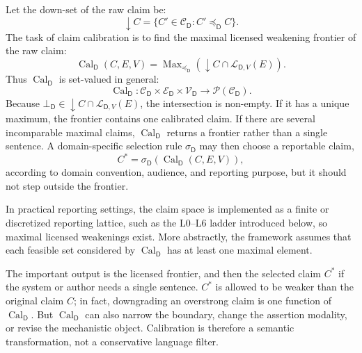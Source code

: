 \documentclass[11pt,a4paper]{article}
\newcommand{\Cal}{\operatorname{Cal}}
\newcommand{\Max}{\operatorname{Max}}
\newcommand{\Dom}{\mathsf{D}}
\begin{document}
Let the down-set of the raw claim be:
\begin{equation}
\downarrow C=\{C'\in\mathcal{C}_{\Dom}:C'\preceq_{\Dom} C\}.
\end{equation}
The task of claim calibration is to find the maximal licensed weakening frontier of the raw claim:
\begin{equation}
\Cal_{\Dom}(C,E,V)
=\Max_{\preceq_{\Dom}}\left(\downarrow C\cap\mathcal{L}_{\Dom,V}(E)\right).
\end{equation}
Thus $\Cal_{\Dom}$ is set-valued in general:
\[
\Cal_{\Dom}:\mathcal{C}_{\Dom}\times\mathcal{E}_{\Dom}\times\mathcal{V}_{\Dom}
\rightarrow \mathcal{P}(\mathcal{C}_{\Dom}).
\]
Because $\bot_{\Dom}\in\downarrow C\cap\mathcal{L}_{\Dom,V}(E)$, the intersection is non-empty. If it has a unique maximum, the frontier contains one calibrated claim. If there are several incomparable maximal claims, $\Cal_{\Dom}$ returns a frontier rather than a single sentence. A domain-specific selection rule $\sigma_{\Dom}$ may then choose a reportable claim,
\[
C^\ast=\sigma_{\Dom}(\Cal_{\Dom}(C,E,V)),
\]
according to domain convention, audience, and reporting purpose, but it should not step outside the frontier.

In practical reporting settings, the claim space is implemented as a finite or discretized reporting lattice, such as the L0--L6 ladder introduced below, so maximal licensed weakenings exist. More abstractly, the framework assumes that each feasible set considered by $\Cal_{\Dom}$ has at least one maximal element.

The important output is the licensed frontier, and then the selected claim $C^\ast$ if the system or author needs a single sentence. $C^\ast$ is allowed to be weaker than the original claim $C$; in fact, downgrading an overstrong claim is one function of $\Cal_{\Dom}$. But $\Cal_{\Dom}$ can also narrow the boundary, change the assertion modality, or revise the mechanistic object. Calibration is therefore a semantic transformation, not a conservative language filter.
\end{document}
